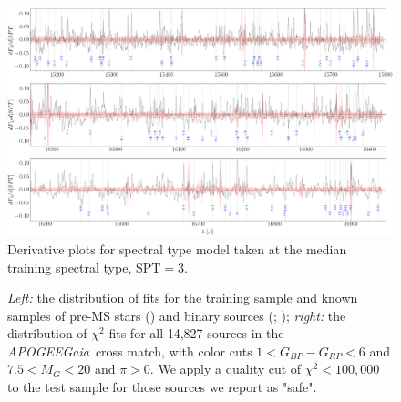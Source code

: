 \documentclass[modern]{aastex62}
\newcommand{\apogee}{\textsl{APOGEE}}
\newcommand{\gaia}{\textsl{Gaia}}
\begin{document}
\begin{figure}[ht]
\begin{center}
\includegraphics[width=16cm]{figures/derivative_jackknife_spt.png}
\end{center}
\caption{Derivative plots for spectral type model taken at the median training spectral type, SPT$=3$.} \label{fig:west_derivative}
\end{figure}


\begin{figure}[ht]
\caption{\textit{Left:} the distribution of fits for the training sample and known samples of pre-MS stars (\citealt{Cottaar:2014}) and binary sources (\citealt{ElBadry:2018}; \citealt{Skinner:2018}); \textit{right:} the distribution of $\chi^2$ fits for all 14,827 sources in the \apogee\-\gaia\ cross match, with color cuts $1<G_{BP}-G_{RP}<6$ and $7.5<M_{G}<20$ and $\pi>0$. We apply a quality cut of $\chi^2 < 100,000$ to the test sample for those sources we report as "safe". \label{fig:chi_dist}}
\end{figure}
\end{document}
